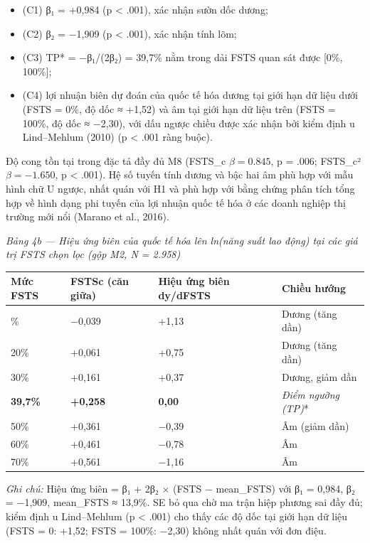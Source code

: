 \documentclass[12pt,a4paper]{article}
\providecommand{\tightlist}{\setlength{\itemsep}{0pt}\setlength{\parskip}{0pt}}
\begin{document}
\begin{itemize}
\tightlist
\item
  (C1) β₁ = +0,984 (p \textless{} .001), xác nhận sườn dốc dương;
\item
  (C2) β₂ = −1,909 (p \textless{} .001), xác nhận tính lõm;
\item
  (C3) TP* = −β₁/(2β₂) = 39,7\% nằm trong dải FSTS quan sát được {[}0\%,
  100\%{]};
\item
  (C4) lợi nhuận biên dự đoán của quốc tế hóa dương tại giới hạn dữ liệu
  dưới (FSTS = 0\%, độ dốc ≈ +1,52) và âm tại giới hạn dữ liệu trên
  (FSTS = 100\%, độ dốc ≈ −2,30), với dấu ngược chiều được xác nhận bởi
  kiểm định u Lind--Mehlum (2010) (p \textless{} .001 ràng buộc).
\end{itemize}

Độ cong tồn tại trong đặc tả đầy đủ M8 (FSTS\_c \(\beta = 0.845\), p =
.006; FSTS\_c² \(\beta = −1.650\), p \textless{} .001). Hệ số tuyến tính
dương và bậc hai âm phù hợp với mẫu hình chữ U ngược, nhất quán với H1
và phù hợp với bằng chứng phân tích tổng hợp về hình dạng phi tuyến của
lợi nhuận quốc tế hóa ở các doanh nghiệp thị trường mới nổi (Marano et
al., 2016).

\emph{Bảng 4b --- Hiệu ứng biên của quốc tế hóa lên ln(năng suất lao
động) tại các giá trị FSTS chọn lọc (gộp M2, N = 2.958)}

\begin{longtable}[]{@{}llll@{}}
\toprule\noalign{}
Mức FSTS & FSTSc (căn giữa) & Hiệu ứng biên dy/dFSTS & Chiều hướng \\
\midrule\noalign{}
\endhead
\bottomrule\noalign{}
\endlastfoot
10\% & −0,039 & +1,13 & Dương (tăng dần) \\
20\% & +0,061 & +0,75 & Dương (tăng dần) \\
30\% & +0,161 & +0,37 & Dương, giảm dần \\
\textbf{39,7\%} & \textbf{+0,258} & \textbf{0,00} & \emph{\emph{Điểm
ngưỡng (TP})}* \\
50\% & +0,361 & −0,39 & Âm (giảm dần) \\
60\% & +0,461 & −0,78 & Âm \\
70\% & +0,561 & −1,16 & Âm \\
\end{longtable}

\emph{Ghi chú:} Hiệu ứng biên = β₁ + 2β₂ × (FSTS − mean\_FSTS) với β₁ =
0,984, β₂ = −1,909, mean\_FSTS ≈ 13,9\%. SE bỏ qua chờ ma trận hiệp
phương sai đầy đủ; kiểm định u Lind--Mehlum (p \textless{} .001) cho
thấy các độ dốc tại giới hạn dữ liệu (FSTS = 0: +1,52; FSTS = 100\%:
−2,30) không nhất quán với đơn điệu.
\end{document}
